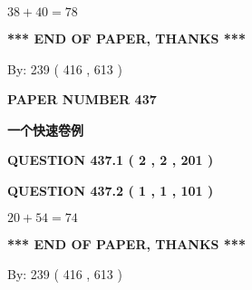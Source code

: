 \documentclass{ctexart}
\begin{document}
 

$ %
38 +  %
40=   %
78$
 
 
   
   
 \vspace{0.2in}
 
   
   
   
   
\vspace{1.0in} 
{\textbf{\large{ *** END OF PAPER, THANKS *** }}} 
   
   
\hspace{1.0in} By: 
 239 ( 416 ,  613 )
   
   
   
   
\newpage 
\setcounter{page}{ 
   437001 } 
   
   
   
   
 {\textbf{ \Large{ PAPER NUMBER  437  }}}
   
   
\vspace{0.2in}
   
   
   
   
   
   
 \vspace{0.2in}
{\LARGE {\textbf{ 一个快速卷例}}}
   
   
  
\vspace{0.2in}
  
{\textbf{\Large{QUESTION
437.1 
 ( 2 , 2 , 201 )
}}}
  
  
  
\vspace{0.2in}
  
{\textbf{\Large{QUESTION
437.2 
 ( 1 , 1 , 101 )
}}}
  
  
 
 

$ %
20 +  %
54=   %
74$
 
 
   
   
 \vspace{0.2in}
 
   
   
   
   
\vspace{1.0in} 
{\textbf{\large{ *** END OF PAPER, THANKS *** }}} 
   
   
\hspace{1.0in} By: 
 239 ( 416 ,  613 )
   
   
   
\end{document}
